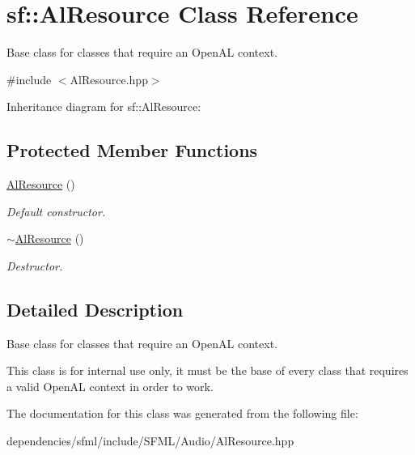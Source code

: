 \hypertarget{classsf_1_1_al_resource}{}\section{sf\+:\+:Al\+Resource Class Reference}
\label{classsf_1_1_al_resource}


Base class for classes that require an Open\+AL context.  




{\ttfamily \#include $<$Al\+Resource.\+hpp$>$}



Inheritance diagram for sf\+:\+:Al\+Resource\+:
\subsection*{Protected Member Functions}
\begin{DoxyCompactItemize}
\item 
\mbox{\label{classsf_1_1_al_resource_a51b4f3a825c5d68386f8683e3e1053d7}} 
\hyperlink{classsf_1_1_al_resource_a51b4f3a825c5d68386f8683e3e1053d7}{Al\+Resource} ()
\begin{DoxyCompactList}\small\item\em Default constructor. \end{DoxyCompactList}\item 
\mbox{\label{classsf_1_1_al_resource_a74ad78198cddcb6e5d847177364049db}} 
\hyperlink{classsf_1_1_al_resource_a74ad78198cddcb6e5d847177364049db}{$\sim$\+Al\+Resource} ()
\begin{DoxyCompactList}\small\item\em Destructor. \end{DoxyCompactList}\end{DoxyCompactItemize}


\subsection{Detailed Description}
Base class for classes that require an Open\+AL context. 

This class is for internal use only, it must be the base of every class that requires a valid Open\+AL context in order to work. 

The documentation for this class was generated from the following file\+:\begin{DoxyCompactItemize}
\item 
dependencies/sfml/include/\+S\+F\+M\+L/\+Audio/Al\+Resource.\+hpp\end{DoxyCompactItemize}

